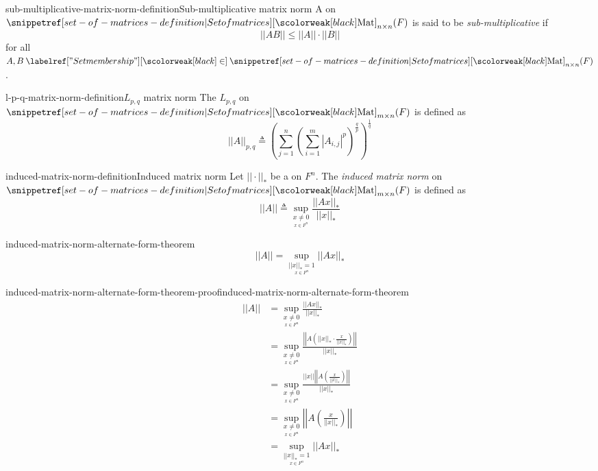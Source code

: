 \documentclass[preview]{standalone}
\begin{document}
\begin{snippetdefinition}{sub-multiplicative-matrix-norm-definition}{Sub-multiplicative matrix norm}
    A \mnorm on \(\matrices_{n\times n}(F)\) is said to be \emph{sub-multiplicative} if
    \[
        ||AB|| \leq ||A|| \cdot ||B||
    \]
    for all \(A,B\in \matrices_{n\times n}(F)\).
\end{snippetdefinition}

\begin{snippetdefinition}{l-p-q-matrix-norm-definition}{\(L_{p,q}\) matrix norm}
    The \mnorm \(L_{p,q}\) on \(\matrices_{m\times n}(F)\) is defined as
    \[
        ||A||_{p,q} \triangleq {\left(
            \sum_{j=1}^n {\left(
                \sum_{i=1}^m |A_{i,j}|^p
            \right)}^{\frac{q}{p}}
        \right)}^{\frac{1}{q}}
    \]
\end{snippetdefinition}

\begin{snippetdefinition}{induced-matrix-norm-definition}{Induced matrix norm}
    Let \(||\cdot||_*\) be a \norm on \(F^n\). The \emph{induced matrix norm}
    on \(\matrices_{m\times n}(F)\) is defined as
    \[
        ||A|| \triangleq \sup_{\underset{x\in F^n}{x \neq 0}} \frac{||Ax||_*}{||x||_*}
    \]
\end{snippetdefinition}

\begin{snippettheorem}{induced-matrix-norm-alternate-form-theorem}{}
    \[
        ||A|| = \sup_{\underset{x\in F^n}{||x||_* = 1}} ||Ax||_*
    \]
\end{snippettheorem}

\begin{snippetproof}{induced-matrix-norm-alternate-form-theorem-proof}{induced-matrix-norm-alternate-form-theorem}{}
    \begin{align*}
        ||A|| &= \sup_{\underset{x\in F^n}{x \neq 0}} \frac{||Ax||_*}{||x||_*} \\
        &= \sup_{\underset{x\in F^n}{x \neq 0}} \frac{\left|\left|A \left(||x||_* \cdot \frac{x}{||x||_*}\right)\right|\right|}{||x||_*} \\
        &= \sup_{\underset{x\in F^n}{x \neq 0}} \frac{||x|| \left|\left| A \left(\frac{x}{||x||_*}\right)\right|\right|}{||x||_*} \\
        &= \sup_{\underset{x\in F^n}{x \neq 0}} \left|\left|A \left(\frac{x}{||x||_*}\right)\right|\right| \\
        &= \sup_{\underset{x\in F^n}{||x||_* = 1}} ||Ax||_*
    \end{align*}
\end{snippetproof}
\end{document}
